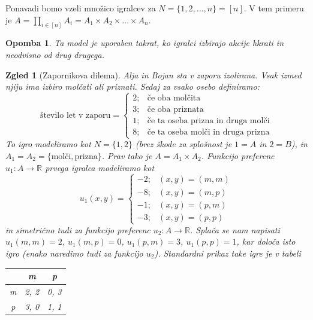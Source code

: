 \documentclass[10pt, a4paper]{article}
\newtheorem*{opomba}{Opomba}
\newtheorem{zgled}[izr]{Zgled}
\newcommand{\R}{\mathbb {R}}
\begin{document}
Ponavadi bomo vzeli množico igralcev za $N = \{1, 2, \dots, n\} = [n]$.
V tem primeru je $A = \prod_{i \in [n]} A_i = A_1 \times A_2 \times \dots \times A_n$.

\begin{opomba}
    Ta model je uporaben takrat, ko igralci izbirajo akcije hkrati in neodvisno od drug drugega.
\end{opomba}

\begin{zgled}[Zapornikova dilema]
    Alja in Bojan sta v zaporu izolirana.
    Vsak izmed njiju ima izbiro molčati ali priznati.
    Sedaj za vsako osebo definiramo:
    $$\textrm{število let v zaporu} = \begin{cases}
        2; & \textrm{če oba molčita}\\
        3; & \textrm{če oba priznata}\\
        1; & \textrm{če ta oseba prizna in druga molči}\\ 
        8; & \textrm{če ta oseba molči in druga prizna}
    \end{cases}$$
    To igro modeliramo kot $N = \{1, 2\}$ (brez škode za splošnost je $1 = A$ in $2 = B$),
    in $A_1 = A_2 = \{\textrm{molči}, \textrm{prizna}\}$.
    Prav tako je $A = A_1 \times A_2$. Funkcijo preferenc $u_1 : A \to \R$ prvega igralca modeliramo 
    kot 
    $$u_1 (x, y) = \begin{cases}
        -2; & (x, y) = (m, m)\\
        -8; & (x, y) = (m, p)\\
        -1; & (x, y) = (p, m)\\
        -3; &(x, y) = (p, p)
    \end{cases}$$
    in simetrično tudi za funkcijo preferenc $u_2 : A \to \R$.
    Splača se nam napisati $u_1(m, m) = 2$, $u_1 (m, p) = 0$, $u_1 (p, m) = 3$, $u_1 (p, p) = 1$,
    kar določa isto igro (enako naredimo tudi za funkcijo $u_2$).
    Standardni prikaz take igre je v tabeli
    \begin{center}
        {\begin{tabular}{c|c|c|}
            & m & p\\
            \hline
            m & 2, 2 & 0, 3\\
            \hline
            p & 3, 0 & 1, 1\\
            \hline
        \end{tabular}}        
    \end{center}
\end{zgled}
\end{document}
